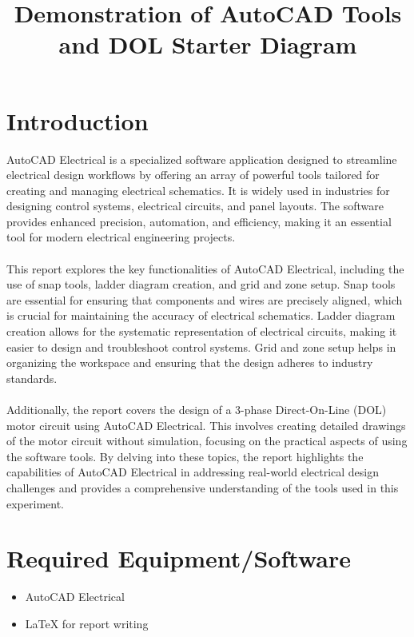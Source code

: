\documentclass[12pt]{article}
\title{Demonstration of AutoCAD Tools and DOL Starter Diagram}
\author{}
\date{}
\begin{document}


\pagebreak

\tableofcontents

\pagebreak
{}
\maketitle

\section*{Introduction}
AutoCAD Electrical is a specialized software application designed to streamline electrical design workflows by offering an array of powerful tools tailored for creating and managing electrical schematics. It is widely used in industries for designing control systems, electrical circuits, and panel layouts. The software provides enhanced precision, automation, and efficiency, making it an essential tool for modern electrical engineering projects.\\\\
This report explores the key functionalities of AutoCAD Electrical, including the use of snap tools, ladder diagram creation, and grid and zone setup. Snap tools are essential for ensuring that components and wires are precisely aligned, which is crucial for maintaining the accuracy of electrical schematics. Ladder diagram creation allows for the systematic representation of electrical circuits, making it easier to design and troubleshoot control systems. Grid and zone setup helps in organizing the workspace and ensuring that the design adheres to industry standards.
\\\\
Additionally, the report covers the design of a 3-phase Direct-On-Line (DOL) motor circuit using AutoCAD Electrical. This involves creating detailed drawings of the motor circuit without simulation, focusing on the practical aspects of using the software tools. By delving into these topics, the report highlights the capabilities of AutoCAD Electrical in addressing real-world electrical design challenges and provides a comprehensive understanding of the tools used in this experiment.

\section*{Required Equipment/Software}
\begin{itemize}
    \item AutoCAD Electrical
    \item \LaTeX{} for report writing
\end{itemize}
\end{document}
